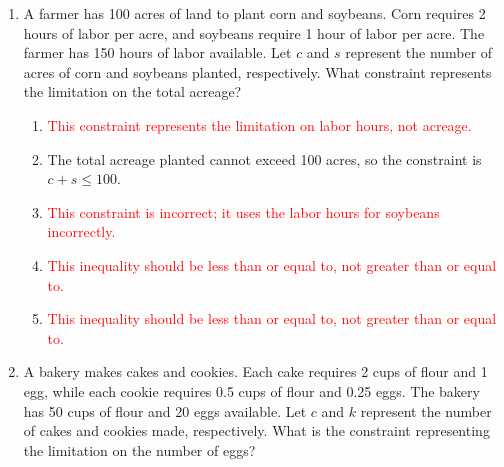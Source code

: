 \documentclass{article}%
\newcommand{\incorrect}[1]{\textcolor{red}{#1}}
\begin{document}
\begin{enumerate}
\begin{enumerate}%
\item The constraint on raw material A is $3x + y \le 100$ because each unit of product X uses 3 units of A, and each unit of product Y uses 1 unit of A. The total usage cannot exceed the available 100 units.%
\item \incorrect{This constraint represents the limitation on raw material B, not A.}%
\item \incorrect{This constraint is incorrect; it uses the amount of raw material B for both products X and Y.}%
\item \incorrect{This is an incorrect inequality; it should be less than or equal to, not greater than or equal to.}%
\item \incorrect{This inequality should be less than or equal to, not greater than or equal to.}%
\end{enumerate}%
\vspace{1em}%
\item A farmer has 100 acres of land to plant corn and soybeans.  Corn requires 2 hours of labor per acre, and soybeans require 1 hour of labor per acre. The farmer has 150 hours of labor available.  Let $c$ and $s$ represent the number of acres of corn and soybeans planted, respectively. What constraint represents the limitation on the total acreage?%
\begin{enumerate}%
\item \incorrect{This constraint represents the limitation on labor hours, not acreage.}%
\item The total acreage planted cannot exceed 100 acres, so the constraint is $c + s \le 100$.%
\item \incorrect{This constraint is incorrect; it uses the labor hours for soybeans incorrectly.}%
\item \incorrect{This inequality should be less than or equal to, not greater than or equal to.}%
\item \incorrect{This inequality should be less than or equal to, not greater than or equal to.}%
\end{enumerate}%
\vspace{1em}%
\item A bakery makes cakes and cookies. Each cake requires 2 cups of flour and 1 egg, while each cookie requires 0.5 cups of flour and 0.25 eggs. The bakery has 50 cups of flour and 20 eggs available. Let $c$ and $k$ represent the number of cakes and cookies made, respectively.  What is the constraint representing the limitation on the number of eggs?%

\end{enumerate}
\end{document}
